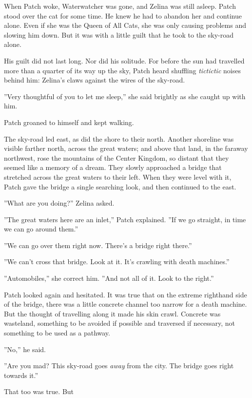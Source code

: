 \documentclass[12pt]{book}
\begin{document}
 When Patch woke, Waterwatcher was gone, and Zelina was still asleep. Patch stood over the cat for some time. He knew he had to abandon her and continue alone. Even if she was the Queen of All Cats, she was only causing problems and slowing him down. But it was with a little guilt that he took to the sky-road alone.\par
 His guilt did not last long. Nor did his solitude. For before the sun had travelled more than a quarter of its way up the sky, Patch heard shuffling {\it tictictic} noises behind him: Zelina's claws against the wires of the sky-road.\par
 ''Very thoughtful of you to let me sleep,'' she said brightly as she caught up with him.\par
 Patch groaned to himself and kept walking.\par
 The sky-road led east, as did the shore to their north. Another shoreline was visible farther north, across the great waters; and above that land, in the faraway northwest, rose the mountains of the Center Kingdom, so distant that they seemed like a memory of a dream. They slowly approached a bridge that stretched across the great waters to their left. When they were level with it, Patch gave the bridge a single searching look, and then continued to the east.\par
 ''What are you doing?'' Zelina asked.\par
 ''The great waters here are an inlet,'' Patch explained. ''If we go straight, in time we can go around them.''\par
 ''We can go over them right now. There's a bridge right there.''\par
 ''We can't cross that bridge. Look at it. It's crawling with death machines.''\par
 ''Automobiles,'' she correct him. ''And not all of it. Look to the right.''\par
 Patch looked again and hesitated. It was true that on the extreme righthand side of the bridge, there was a little concrete channel too narrow for a death machine. But the thought of travelling along it made his skin crawl. Concrete was wasteland, something to be avoided if possible and traversed if necessary, not something to be used as a pathway.\par
 ''No,'' he said.\par
 ''Are you mad? This sky-road goes {\it away} from the city. The bridge goes right towards it.''\par
 That too was true. But %
\end{document}
